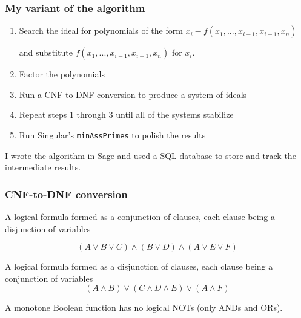 \documentclass[11pt]{beamer}
\begin{document}
\begin{frame}
\frametitle{My variant of the algorithm}
\begin{enumerate}
\item Search the ideal for polynomials of the form $x_i-f(x_1,...,x_{i-1},x_{i+1},x_n)$

and substitute $f(x_1,...,x_{i-1},x_{i+1},x_n)$ for $x_i$.

\item Factor the polynomials

\item Run a CNF-to-DNF conversion to produce a system of ideals

\item Repeat steps 1 through 3 until all of the systems stabilize

\item Run Singular's {\tt minAssPrimes} to polish the results
\end{enumerate}

\vskip 12pt

I wrote the algorithm in Sage and used a SQL database to store and track
the intermediate results.
\end{frame}

\begin{frame}
\frametitle{CNF-to-DNF conversion}

\begin{definition}
A logical formula formed as a conjunction of clauses, each clause being a disjunction of variables

\[
(A \vee B \vee C) \wedge (B \vee D) \wedge (A \vee E \vee F)
\]
\end{definition}

\begin{definition}
A logical formula formed as a disjunction of clauses, each clause being a conjunction of variables
\[
(A \wedge B) \vee (C \wedge D \wedge E) \vee (A \wedge F)
\]
\end{definition}

\begin{definition}
A monotone Boolean function has no logical NOTs (only ANDs and ORs).
\end{definition}
\end{frame}
\end{document}
